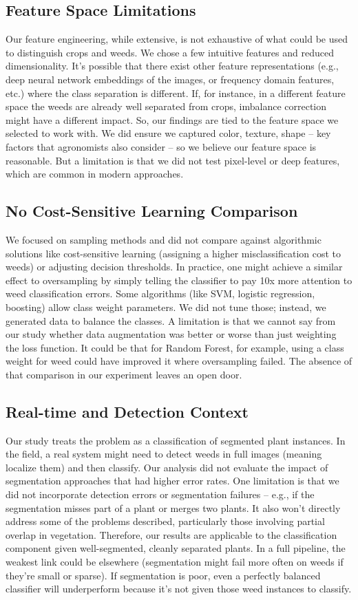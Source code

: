 \documentclass[letterpaper, notitlepage]{report}
\begin{document}
\subsection{Feature Space Limitations}
Our feature engineering, while extensive, is not exhaustive of what could be used to distinguish crops and weeds. We chose a few intuitive features and reduced dimensionality. It’s possible that there exist other feature representations (e.g., deep neural network embeddings of the images, or frequency domain features, etc.) where the class separation is different. If, for instance, in a different feature space the weeds are already well separated from crops, imbalance correction might have a different impact. So, our findings are tied to the feature space we selected to work with. We did ensure we captured color, texture, shape – key factors that agronomists also consider – so we believe our feature space is reasonable. But a limitation is that we did not test pixel-level or deep features, which are common in modern approaches.

\subsection{No Cost-Sensitive Learning Comparison}
We focused on sampling methods and did not compare against algorithmic solutions like cost-sensitive learning (assigning a higher misclassification cost to weeds) or adjusting decision thresholds. In practice, one might achieve a similar effect to oversampling by simply telling the classifier to pay 10x more attention to weed classification errors. Some algorithms (like SVM, logistic regression, boosting) allow class weight parameters. We did not tune those; instead, we generated data to balance the classes. A limitation is that we cannot say from our study whether data augmentation was better or worse than just weighting the loss function. It could be that for Random Forest, for example, using a class weight for weed could have improved it where oversampling failed. The absence of that comparison in our experiment leaves an open door.

\subsection{Real-time and Detection Context}
Our study treats the problem as a classification of segmented plant instances. In the field, a real system might need to detect weeds in full images (meaning localize them) and then classify. Our analysis did not evaluate the impact of segmentation approaches that had higher error rates. One limitation is that we did not incorporate detection errors or segmentation failures – e.g., if the segmentation misses part of a plant or merges two plants.  It also won’t directly address some of the problems described, particularly those involving partial overlap in vegetation.  Therefore, our results are applicable to the classification component given well-segmented, cleanly separated plants. In a full pipeline, the weakest link could be elsewhere (segmentation might fail more often on weeds if they’re small or sparse). If segmentation is poor, even a perfectly balanced classifier will underperform because it’s not given those weed instances to classify. 
\end{document}
